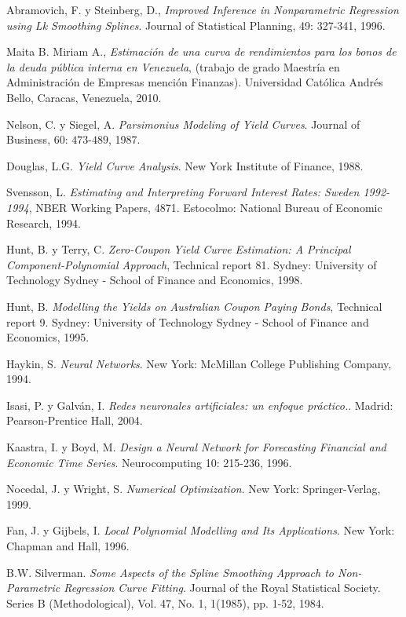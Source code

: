 \begin{thebibliography}{99}

 {\sc Abramovich, F. y Steinberg, D.}, {\it Improved Inference in Nonparametric Regression using Lk Smoothing Splines}. Journal of Statistical Planning, 49: 327-341, 1996.

 {\sc Maita B. Miriam A.}, {\it Estimaci\'on de una curva de rendimientos para los bonos de la deuda p\'ublica interna en Venezuela}, (trabajo de grado Maestr\'ia en Administraci\'on de Empresas menci\'on Finanzas).  Universidad Cat\'olica Andr\'es Bello, Caracas, Venezuela, 2010.

 {\sc Nelson, C. y Siegel, A.} {\it Parsimonius Modeling of Yield Curves}. Journal of
Business, $60$: $473$-$489$, 1987.

 {\sc Douglas, L.G.} {\it Yield Curve Analysis}. New York Institute of Finance, 1988.


 {\sc Svensson, L.} {\it Estimating and Interpreting Forward Interest Rates: Sweden 1992-1994}, NBER Working Papers, 4871. Estocolmo: National Bureau of Economic Research, 1994.

 {\sc Hunt, B. y Terry, C.} {\it Zero-Coupon Yield Curve Estimation: A Principal Component-Polynomial Approach}, Technical report 81. Sydney: University of Technology Sydney - School of Finance and Economics, 1998.

 {\sc Hunt, B.} {\it Modelling the Yields on Australian Coupon Paying Bonds}, Technical report 9. Sydney: University of Technology Sydney - School of Finance and Economics, 1995.

 {\sc Haykin, S.} {\it Neural Networks}. New York: McMillan College Publishing Company, 1994.

 {\sc Isasi, P. y Galv\'an, I.} {\it Redes neuronales artificiales: un enfoque pr\'actico.}. Madrid: Pearson-Prentice Hall, 2004.

 {\sc Kaastra, I. y Boyd, M.} {\it Design a Neural Network for Forecasting Financial and Economic Time Series}. Neurocomputing 10: 215-236, 1996.

 {\sc Nocedal, J. y Wright, S.} {\it Numerical Optimization}. New York: Springer-Verlag, 1999.


 {\sc Fan, J. y Gijbels, I.} {\it Local Polynomial Modelling and Its Applications}. New York: Chapman and Hall, 1996.

 {\sc B.W. Silverman.} {\it Some Aspects of the Spline Smoothing Approach to Non-Parametric Regression Curve Fitting}. Journal of the Royal Statistical Society. Series B (Methodological), Vol. 47, No. 1, 1(1985), pp. 1-52, 1984.



\end{thebibliography}
